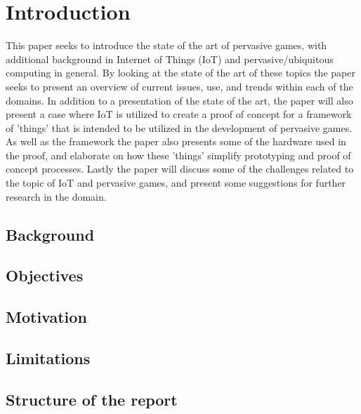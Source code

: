 \chapter{Introduction}
This paper seeks to introduce the state of the art of pervasive games, with additional background in Internet of Things (IoT) and pervasive/ubiquitous computing in general. By looking at the state of the art of these topics the paper seeks to present an overview of current issues, use, and trends within each of the domains. In addition to a presentation of the state of the art, the paper will also present a case where IoT is utilized to create a proof of concept for a framework of 'things' that is intended to be utilized in the development of pervasive games. As well as the framework the paper also presents some of the hardware used in the proof, and elaborate on how these 'things' simplify prototyping and proof of concept processes. Lastly the paper will discuss some of the challenges related to the topic of IoT and pervasive games, and present some suggestions for further research in the domain. 

\section{Background}
\section{Objectives}
\section{Motivation}
\section{Limitations}
\section{Structure of the report}
